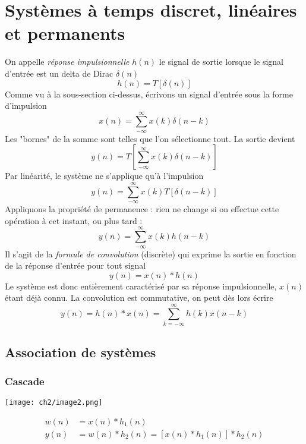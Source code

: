 \section{Systèmes à temps discret, linéaires et permanents}
On appelle \textit{réponse impulsionnelle} $h(n)$ le signal de sortie lorsque le 
signal d'entrée est un delta de Dirac $\delta(n)$
\begin{equation}
h(n) = T[\delta(n)]
\end{equation}
Comme vu à la sous-section ci-dessus, écrivons un signal d'entrée sous la forme 
d'impulsion
\begin{equation}
x(n) = \sum_{-\infty}^\infty x(k)\delta(n-k)
\end{equation}
Les "bornes" de la somme sont telles que l'on sélectionne tout. La sortie devient 
\begin{equation}
y(n) = T\left[\sum_{-\infty}^\infty x(k)\delta(n-k) \right]
\end{equation}
Par linéarité, le système ne s'applique qu'à l'impulsion
\begin{equation}
y(n) = \sum_{-\infty}^\infty x(k)T\left[\delta(n-k) \right]
\end{equation}
Appliquons la propriété de permanence : rien ne change si on effectue cette opération 
à cet instant, ou plus tard :
\begin{equation}
y(n) = \sum_{-\infty}^\infty x(k) h(n-k)
\end{equation}
Il s'agit de la \textit{formule de convolution} (discrète) qui exprime la sortie en 
fonction de la réponse d'entrée pour tout signal
\begin{equation}
y(n) = x(n) * h(n)
\end{equation}
Le système est donc entièrement caractérisé par sa réponse impulsionnelle, $x(n)$ 
étant déjà connu. La convolution est commutative, on peut dès lors écrire
\begin{equation}
y(n) = h(n)*x(n) = \sum_{k=-\infty}^\infty h(k)x(n-k)
\end{equation}
	
	\subsection{Association de systèmes}		
		\subsubsection{Cascade}
		\begin{center}
		\texttt{[image: ch2/image2.png]}
		\end{center}
		\begin{equation}
		\begin{array}{ll}
		w(n) &= x(n)*h_1(n)\\
		y(n) &= w(n)*h_2(n) = [x(n)*h_1(n)]*h_2(n)
		\end{array}
		\end{equation}
		
